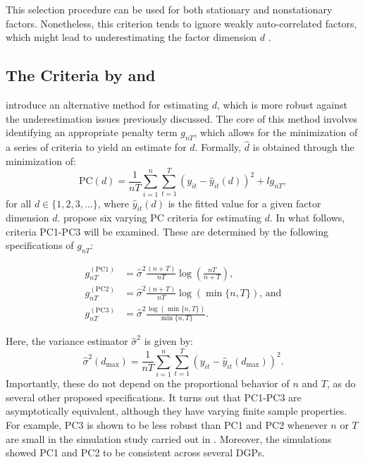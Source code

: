 This selection procedure can be used for both stationary and nonstationary factors. Nonetheless, this criterion tends to ignore weakly auto-correlated factors, which might lead to underestimating the factor dimension $d$ \citep{bada2012phtt}.

\subsection{The Criteria by \citet{bai2002determining} and \citet{bai2004estimating}}\label{bai_dim}

\citet{bai2002determining} introduce an alternative method for estimating $d$, which is more robust against the underestimation issues previously discussed. The core of this method involves identifying an appropriate penalty term $g_{n T}$, which allows for the minimization of a series of criteria to yield an estimate for $d$. Formally, $\hat{d}$ is obtained through the minimization of:
\begin{equation}
    \mathrm{PC}(d)=\frac{1}{n T} \sum_{i=1}^n \sum_{t=1}^T\left(y_{i t}-\hat{y}_{i t}(d)\right)^2+l g_{n T},
\end{equation}
for all $d \in \{1,2,3, \ldots\} $, where $\hat{y}_{i t}(d)$ is the fitted value for a given factor dimension $d$. \citet{bai2002determining} propose six varying PC criteria for estimating $d$. In what follows, criteria PC1-PC3 will be examined. These are determined by the following specifications of $g_{nT}$:

\begin{align}
g_{n T}^{(\mathrm{PC} 1)} & =\hat{\sigma}^2 \frac{(n+T)}{n T} \log \left(\frac{n T}{n+T}\right),\\
g_{n T}^{(\mathrm{PC} 2)} & =\hat{\sigma}^2 \frac{(n+T)}{n T} \log (\min \{n, T\}), \, \text{and} \\
g_{n T}^{(\mathrm{PC} 3)} & =\hat{\sigma}^2 \frac{\log (\min \{n, T\})}{\min \{n, T\}}.
\end{align}

Here, the variance estimator $\hat{\sigma}^2$ is given by:
\begin{equation}
    \hat{\sigma}^2\left(d_{\max }\right)=\frac{1}{n T} \sum_{i=1}^n \sum_{t=1}^T\left(y_{i t}-\hat{y}_{i t}\left(d_{\max }\right)\right)^2 .
\end{equation}
Importantly, these do not depend on the proportional behavior of $n$ and $T$, as do several other proposed specifications. It turns out that PC1-PC3 are asymptotically equivalent, although they have varying finite sample properties. For example, PC3 is shown to be less robust than PC1 and PC2 whenever $n$ or $T$ are small in the simulation study carried out in \citet{bai2002determining}. Moreover, the simulations showed PC1 and PC2 to be consistent across several \ac{DGPs}. 

